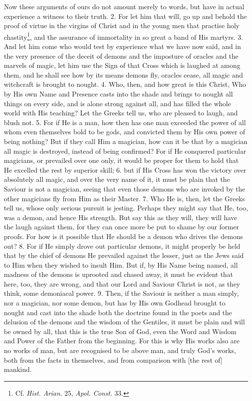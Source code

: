 Now these arguments of ours do not amount merely to words, but have in actual experience a witness to their truth. 2. For let him that will, go up and behold the proof of virtue in the virgins of Christ and in the young men that practise holy chastity\footnote{Cf. \emph{Hist. Arian.} 25, \emph{Apol. Const.} 33.}, and the assurance of immortality in so great a band of His martyrs. 3. And let him come who would test by experience what we have now said, and in the very presence of the deceit of demons and the imposture of oracles and the marvels of magic, let him use the Sign of that Cross which is laughed at among them, and he shall see how by its means demons fly, oracles cease, all magic and witchcraft is brought to nought. 4. Who, then, and how great is this Christ, Who by His own Name and Presence casts into the shade and brings to nought all things on every side, and is alone strong against all, and has filled the whole world with His teaching? Let the Greeks tell us, who are pleased to laugh, and blush not. 5. For if He is a man, how then has one man exceeded the power of all whom even themselves bold to be gods, and convicted them by His own power of being nothing? But if they call Him a magician, how can it be that by a magician all magic is destroyed, instead of being confirmed? For if He conquered particular magicians, or prevailed over one only, it would be proper for them to hold that He excelled the rest by superior skill; 6. but if His Cross has won the victory over absolutely all magic, and over the very name of it, it must be plain that the Saviour is not a magician, seeing that even those demons who are invoked by the other magicians fly from Him as their Master. 7. Who He is, then, let the Greeks tell us, whose only serious pursuit is jesting. Perhaps they might say that He, too, was a demon, and hence His strength. But say this as they will, they will have the laugh against them, for they can once more be put to shame by our former proofs. For how is it possible that He should be a demon who drives the demons out? 8. For if He simply drove out particular demons, it might properly be held that by the chief of demons He prevailed against the lesser, just as the Jews said to Him when they wished to insult Him. But if, by His Name being named, all madness of the demons is uprooted and chased away, it must be evident that here, too, they are wrong, and that our Lord and Saviour Christ is not, as they think, some demoniacal power. 9. Then, if the Saviour is neither a man simply, nor a magician, nor some demon, but has by His own Godhead brought to nought and cast into the shade both the doctrine found in the poets and the delusion of the demons and the wisdom of the Gentiles, it must be plain and will be owned by all, that this is the true Son of God, even the Word and Wisdom and Power of the Father from the beginning. For this is why His works also are no works of man, but are recognised to be above man, and truly God’s works, both from the facts in themselves, and from comparison with [the rest of] mankind.

